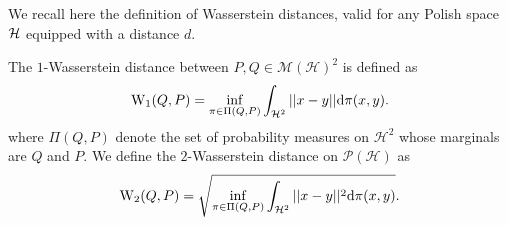 \begin{noaddcontents}
    We recall here the definition of Wasserstein distances, valid for any Polish space $\mathcal{H}$ equipped with a distance $d$.
    
    \begin{definition}
    \label{def: wasserstein-chap-4}
    The $1$-Wasserstein distance between $P,Q \in \mathcal{M}(\mathcal{H})^2$ is defined as
    \[ \mathrm{W}_1(Q,P) = \inf_{\pi \in \Pi(Q,P)} \int_{\mathcal{H}^2} ||x-y||\mathrm{d}\pi(x,y). \]
    where $\Pi(Q,P)$ denote the set of probability measures on $\mathcal{H}^2$ whose marginals are $Q$ and $P$.
    We define the $2$-Wasserstein distance on $\mathcal{P}(\mathcal{H})$ as
    \[ \mathrm{W}_2(Q,P) = \sqrt{\inf_{\pi \in \Pi(Q,P)} \int_{\mathcal{H}^2} ||x-y||^2\mathrm{d}\pi(x,y)}. \]
    \end{definition}
    \begin{comment}
    \subsection{Stochastic Gradient Descent.}
    \begin{algorithm}[htbp]
      \begin{algorithmic}[1]
      \State \textbf{Input:} Initial point $\mathbf{h}_1=0$, steps $(\eta_t)_{t\geq 1}$, dataset $\S$\\
      \textbf{For $t=1\cdots T$:}
      \State \hspace{0.7cm}Draw $j_t\sim Unif\LP\LC 1 \cdots m\RC \RP$
      \State \hspace{0.7cm}Update $\mathbf{h}_{t+1} = \mathbf{h}_t - \eta_t \nabla_h\ell(\mathbf{h}_t,\z_{j_t})$
      \State \textbf{return} $\mathbf{h}_{T+1}$
      \end{algorithmic}
      \caption{Stochastic Gradient Descent}
      \label{alg:sgd}
      \end{algorithm}
    

\end{comment}
\end{noaddcontents}
